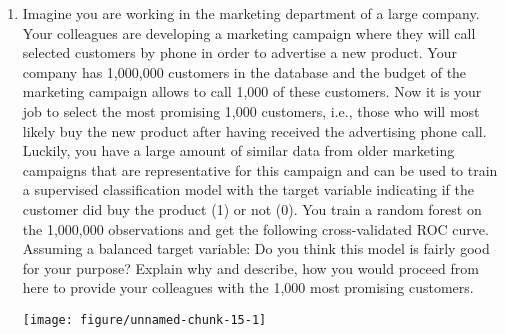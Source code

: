 \documentclass[a4paper]{article}
\makeatletter
\def\maxwidth{ %
  \ifdim\Gin@nat@width>\linewidth
    \linewidth
  \else
    \Gin@nat@width
  \fi
}
\makeatother
\begin{document}
{\begin{enumerate}
  \item Imagine you are working in the marketing department of a large company. 
  Your colleagues are developing a marketing campaign where they will call 
  selected customers by phone in order to advertise a new product. Your company 
  has 1,000,000 customers in the database and the budget of the marketing 
  campaign allows to call 1,000 of these customers. Now it is your job to select 
  the most promising 1,000 customers, i.e., those who will most likely buy the 
  new product after having received the advertising phone call. Luckily, you 
  have a large amount of similar data from older marketing campaigns that are 
  representative for this campaign and can be used to train a supervised 
  classification model with the target variable indicating if the customer did 
  buy the product (1) or not (0). You train a random forest on the 1,000,000 
  observations and get the following cross-validated ROC curve. Assuming a 
  balanced target variable: Do you think this model is fairly good for your 
  purpose? Explain why and describe, how you would proceed from here to provide 
  your colleagues with the 1,000 most promising customers.

\texttt{[image: figure/unnamed-chunk-15-1]} 

\end{enumerate}

}
\end{document}
